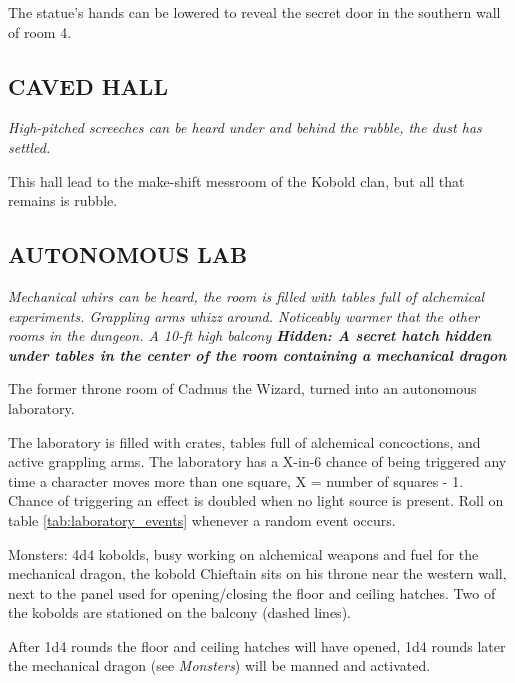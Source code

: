 \documentclass[letterpaper,sansserif,tightsqueeze]{rpg-module}
\begin{document}
The statue's hands can be lowered to reveal the secret door in the southern wall of room 4.

\subsection{CAVED HALL}
\textit{High-pitched screeches can be heard under and behind the rubble, the dust has settled.}

This hall lead to the make-shift messroom of the Kobold clan, but all that remains is rubble.

\subsection{AUTONOMOUS LAB}
\textit{Mechanical whirs can be heard, the room is filled with tables full of alchemical experiments. Grappling arms whizz around. Noticeably warmer that the other rooms in the dungeon. A 10-ft high balcony \textbf{Hidden: A secret hatch hidden under tables in the center of the room containing a mechanical dragon}}

The former throne room of Cadmus the Wizard, turned into an autonomous laboratory.

The laboratory is filled with crates, tables full of alchemical concoctions, and active grappling arms. The laboratory has a X-in-6 chance of being triggered any time a character moves more than one square, X = number of squares - 1. Chance of triggering an effect is doubled when no light source is present. Roll on table \ref{tab:laboratory_events} whenever a random event occurs.

Monsters: 4d4 kobolds, busy working on alchemical weapons and fuel for the mechanical dragon, the kobold Chieftain sits on his throne near the western wall, next to the panel used for opening/closing the floor and ceiling hatches. Two of the kobolds are stationed on the balcony (dashed lines).

After 1d4 rounds the floor and ceiling hatches will have opened, 1d4 rounds later the mechanical dragon (see \textit{Monsters}) will be manned and activated.
\end{document}
